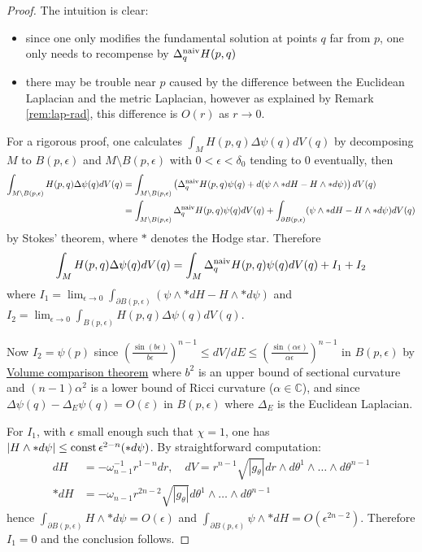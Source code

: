 \begin{proof}
The intuition is clear:
\begin{itemize}
\item since one only modifies the fundamental solution at points \(q\) far from \(p\), one
only needs to recompense by \(\Delta_q^{\rm naiv}H(p,q)\)
\item there may be trouble near \(p\) caused by the difference between the Euclidean Laplacian
and the metric Laplacian, however as explained by Remark \ref{rem:lap-rad}, this difference is
\(O(r)\) as \(r\to 0\).
\end{itemize}
For a rigorous proof, one calculates \(\int_M H(p,q)\Delta \psi(q) dV(q)\) by
decomposing \(M\) to \(B(p,\epsilon)\) and \(M\setminus B(p,\epsilon)\) with \(0<\epsilon<\delta_0\) tending to \(0\) eventually, then
\begin{equation*}
\begin{split}
\int_{M\setminus B(p,\epsilon)} H(p,q)\Delta\psi(q)dV(q) &= \int_{M\setminus B(p,\epsilon)} \left(\Delta_q^{\rm naiv}H(p,q)\psi(q) + d(\psi\wedge *dH - H\wedge *d\psi)\right) dV(q)\\
		 &= \int_{M\setminus B(p,\epsilon)} \Delta_q^{\rm naiv}H(p,q)\psi(q) dV(q) +\int_{\partial B(p,\epsilon)} (\psi\wedge *dH - H\wedge *d\psi) dV(q)
\end{split}   
\end{equation*}
by Stokes' theorem, where \(*\) denotes the Hodge star. Therefore
\[ \int_M H(p,q)\Delta\psi(q) dV(q) = \int_M\Delta_q^{\rm naiv} H(p,q) \psi(q) dV(q) + I_1 +
I_2\]
where \(I_1 = \lim_{\epsilon\to 0} \int_{\partial B(p,\epsilon)}(\psi\wedge *dH
-H\wedge * d\psi)\) and \(I_2 = \lim_{\epsilon\to 0} \int_{B(p,\epsilon)}
H(p,q)\Delta\psi(q) dV(q)\).

Now \(I_2 = \psi(p)\) since \((\frac{\sin (b\epsilon)}{b\epsilon})^{n-1} \leq dV/dE \leq
(\frac{\sin (\alpha \epsilon)}{\alpha\epsilon})^{n-1}\) in \(B(p,\epsilon)\) by \href{sobolev-riemannian.org}{Volume comparison theorem}
where \(b^2\) is an upper bound of sectional curvature and \((n-1)\alpha^2\) is a lower
bound of Ricci curvature (\(\alpha\in \mathbb{C}\)), and since \(\Delta\psi(q)
-\Delta_E\psi(q) = O(\varepsilon)\) in \(B(p,\epsilon)\) where \(\Delta_E\) is the
Euclidean Laplacian.

For \(I_1\), with \(\epsilon\) small enough such that \(\chi=1\), one has
\(|H\wedge * d\psi| \leq \mathop{\rm const }\nolimits \epsilon^{2-n} (* d\psi)\). By straightforward
computation:
\begin{equation*}
\begin{split}
dH &= -\omega_{n-1}^{-1} r^{1-n}dr,\quad dV = r^{n-1}\sqrt{|g_\theta|} dr\wedge d\theta^1\wedge\dots\wedge d\theta^{n-1}\\
*dH &= -\omega_{n-1}r^{2n-2}\sqrt{|g_\theta|} d\theta^1\wedge\dots\wedge d\theta^{n-1}
\end{split}   
\end{equation*}
hence \(\int_{\partial B(p,\epsilon)} H\wedge * d\psi = O(\epsilon)\) and \(\int_{\partial B(p,\epsilon)} \psi\wedge *dH = O(\epsilon^{2n-2})\). Therefore \(I_1=0\) and the conclusion follows.
\end{proof}

